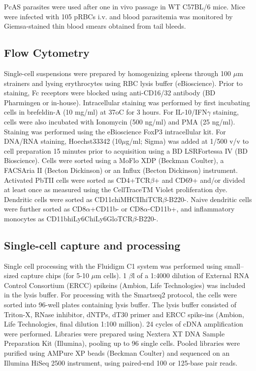 PcAS parasites were used after one in vivo passage in WT C57BL/6 mice. Mice were infected with 105 pRBCs i.v. and blood parasitemia was monitored by Giemsa-stained thin blood smears obtained from tail bleeds.

\subsection{Flow Cytometry}

Single-cell suspensions were prepared by homogenizing spleens through 100 \( \mu \)m strainers and lysing erythrocytes using RBC lysis buffer (eBioscience). Prior to staining, Fc receptors were blocked using anti-CD16/32 antibody (BD Pharmingen or in-house). Intracellular staining was performed by first incubating cells in brefeldin-A (10 mg/ml) at 37oC for 3 hours. For IL-10/IFN\( \gamma \) staining, cells were also incubated with Ionomycin (500 ng/ml) and PMA (25 ng/ml). Staining was performed using the eBioscience FoxP3 intracellular kit. For DNA/RNA staining, Hoechst33342 (10\( \mu \)g/ml; Sigma) was added at 1/500 v/v to cell preparation 15 minutes prior to acquisition using a BD LSRFortessa IV (BD Bioscience). Cells were sorted using a MoFlo XDP (Beckman Coulter), a FACSAria II (Becton Dickinson) or an Influx (Becton Dickinson) instrument. Activated PbTII cells were sorted as CD4+TCR\( \beta \)+ and CD69+ and/or divided at least once as measured using the CellTraceTM Violet proliferation dye. Dendritic cells were sorted as CD11chiMHCIIhiTCR\( \beta \)-B220-. Naive dendritic cells were further sorted as CD8\( \alpha \)+CD11b- or CD8\( \alpha \)-CD11b+, and inflammatory monocytes as CD11bhiLy6ChiLy6GloTCR\( \beta \)-B220-.

\subsection{Single-cell capture and processing}

Single cell processing with the Fluidigm C1 system was performed using small–sized capture chips (for 5-10 \( \mu \)m cells). 1 \( \beta \)l of a 1:4000 dilution of External RNA Control Consortium (ERCC) spikeins (Ambion, Life Technologies) was included in the lysis buffer. For processing with the Smartseq2 protocol, the cells were sorted into 96-well plates containing lysis buffer. The lysis buffer consisted of Triton-X, RNase inhibitor, dNTPs, dT30 primer and ERCC spike-ins (Ambion, Life Technologies, final dilution 1:100 million). 24 cycles of cDNA amplification were performed. Libraries were prepared using Nextera XT DNA Sample Preparation Kit (Illumina), pooling up to 96 single cells. Pooled libraries were purified using AMPure XP beads (Beckman Coulter) and sequenced on an Illumina HiSeq 2500 instrument, using paired-end 100 or 125-base pair reads.

